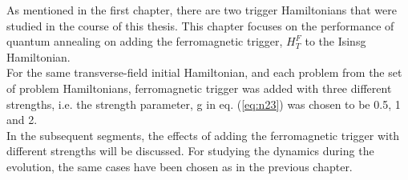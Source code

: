 \documentclass[../main.tex]{subfiles}
\begin{document}
As mentioned in the first chapter, there are two trigger Hamiltonians that were studied in the course of this thesis. This chapter focuses on the performance of quantum annealing on adding the ferromagnetic trigger, $H_T^F$ to the Isinsg Hamiltonian. \\
For the same transverse-field initial Hamiltonian, and each problem from the set of problem Hamiltonians, ferromagnetic trigger was added with three different strengths, i.e. the strength parameter, g in eq. (\ref{eq:n23}) was chosen to be 0.5, 1 and 2.\\
In the subsequent segments, the effects of adding the ferromagnetic trigger with different strengths will be discussed. For studying the dynamics during the evolution, the same cases have been chosen as in the previous chapter.
\end{document}

